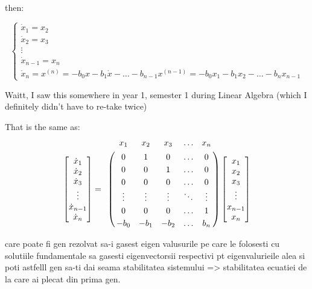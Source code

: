 then:

\[
    \begin{cases}
        \dot{x}_1 = x_2     \\
        \dot{x}_2 = x_3     \\
        \vdots              \\
        \dot{x}_{n-1} = x_n \\
        \dot{x}_n  = x^{(n)} = -b_0x - b_1\dot{x} - \dots - b_{n-1} x^{(n-1)} = -b_0 x_1 - b_1 x_2 - \dots - b_n x_{n-1}
    \end{cases}
\]

Waitt, I saw this somewhere in year 1, semester 1 during Linear Algebra (which I definitely didn't have to re-take twice)

That is the same as:
\begin{align*}
    \begin{bmatrix}
        \dot{x}_1     \\
        \dot{x}_2     \\
        \dot{x}_3     \\
        \vdots        \\
        \dot{x}_{n-1} \\
        \dot{x}_n
    \end{bmatrix} =
    \bordermatrix{ & x_1    & x_2    & x_3    & \ldots & x_n \cr
                   & 0      & 1      & 0      & \ldots & 0 \cr
                   & 0      & 0      & 1      & \ldots & 0 \cr
                   & 0      & 0      & 0      & \ldots & 0 \cr
                   & \vdots & \vdots & \vdots & \ddots & \vdots \cr
                   & 0      & 0      & 0      & \ldots & 1 \cr
                   & -b_0   & -b_1   & -b_2   & \ldots & b_n }
    \begin{bmatrix}
        x_1     \\
        x_2     \\
        x_3     \\
        \vdots  \\
        x_{n-1} \\
        x_n
    \end{bmatrix}
\end{align*}

care poate fi gen rezolvat sa-i gasest eigen valusurile pe care le folosesti cu solutiile fundamentale sa gasesti eigenvectorsii respectivi pt eigenvalurieile alea si poti astfelll gen sa-ti dai seama stabilitatea sistemului => stabilitatea ecuatiei de la care ai plecat din prima gen.


